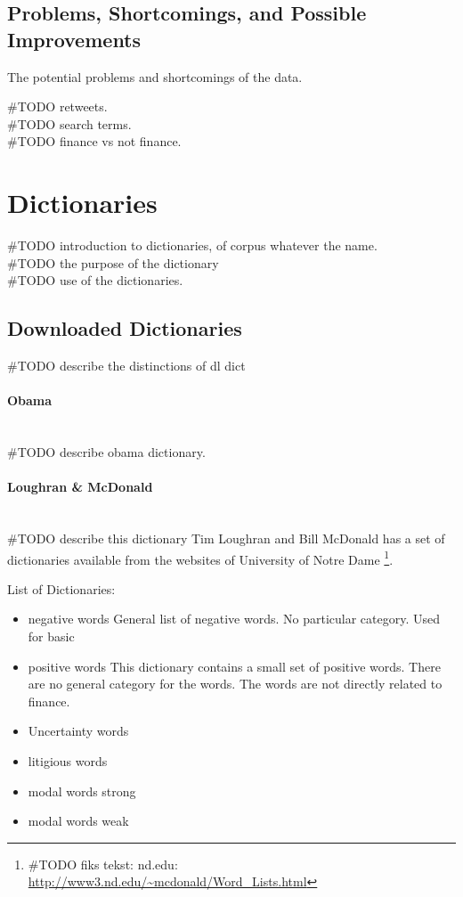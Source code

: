 \subsection{Problems, Shortcomings, and Possible Improvements}
The potential problems and shortcomings of the data. 

#TODO retweets.\\ 
#TODO search terms.\\
#TODO finance vs not finance.\\

\section{Dictionaries}\label{data:dictionaries}
#TODO introduction to dictionaries, of corpus whatever the name. \\
#TODO the purpose of the dictionary\\
#TODO use of the dictionaries. \\
%

\subsection{Downloaded Dictionaries}
#TODO describe the distinctions of dl dict

\paragraph{Obama}
\hspace{0pt}\\
#TODO describe obama dictionary.\\ 

\paragraph{Loughran & McDonald}
\hspace{0pt}\\
#TODO describe this dictionary
Tim Loughran and Bill McDonald has a set of dictionaries available from the
websites of University of Notre Dame \footnote{#TODO fiks tekst: nd.edu:
\url{http://www3.nd.edu/~mcdonald/Word_Lists.html}}. 

List of Dictionaries:
\begin{itemize}
    \item negative words
General list of negative words. No particular category. Used for basic   
    \item positive words
This dictionary contains a small set of positive words. There are no general
category for the words. The words are not directly related to finance. 
    \item Uncertainty words
    \item litigious words
    \item modal words strong
    \item modal words weak
\end{itemize}
%


